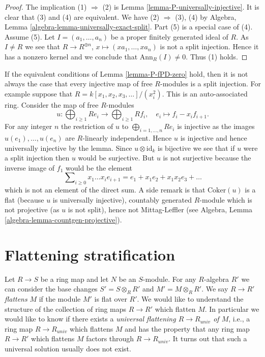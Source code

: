 \begin{proof}
The implication (1) $\Rightarrow$ (2) is
Lemma \ref{lemma-P-universally-injective}.
It is clear that (3) and (4) are equivalent.
We have (2) $\Rightarrow$ (3), (4) by
Algebra, Lemma \ref{algebra-lemma-universally-exact-split}.
Part (5) is a special case of (4).
Assume (5). Let $I = (a_1, \ldots, a_n)$ be a proper finitely generated
ideal of $R$. As $I \not = R$ we see that
$R \to R^{\oplus n}$, $x \mapsto (xa_1, \ldots, xa_n)$
is not a split injection. Hence it has a nonzero kernel and we conclude
that $\text{Ann}_R(I) \not = 0$. Thus (1) holds.
\end{proof}

\begin{example}
\label{example-auto-ass-weird-flat}
If the equivalent conditions of
Lemma \ref{lemma-P-fPD-zero}
hold, then it is not always the case that every injective map of
free $R$-modules is a split injection. For example suppose that
$R = k[x_1, x_2, x_3, \ldots]/(x_i^2)$. This is an auto-associated ring.
Consider the map of free $R$-modules
$$
u :
\bigoplus\nolimits_{i \geq 1} Re_i
\longrightarrow
\bigoplus\nolimits_{i \geq 1} Rf_i, \quad
e_i \longmapsto f_i - x_if_{i + 1}.
$$
For any integer $n$ the restriction of $u$ to
$\bigoplus_{i = 1, \ldots, n} Re_i$ is injective as the images
$u(e_1), \ldots, u(e_n)$ are $R$-linearly independent. Hence
$u$ is injective and hence universally injective by the lemma.
Since $u \otimes \text{id}_k$ is bijective we see that if
$u$ were a split injection then $u$ would be surjective. But $u$ is not
surjective because the inverse image of $f_1$ would be the element
$$
\sum\nolimits_{i \geq 0} x_1 \ldots x_ie_{i + 1} =
e_1 + x_1e_2 + x_1x_2e_3 + \ldots
$$
which is not an element of the direct sum. A side remark is that
$\text{Coker}(u)$ is a flat (because $u$ is universally injective),
countably generated $R$-module which is not projective (as $u$ is not
split), hence not Mittag-Leffler (see
Algebra, Lemma \ref{algebra-lemma-countgen-projective}).
\end{example}









\section{Flattening stratification}
\label{section-flattening}

\noindent
Let $R \to S$ be a ring map and let $N$ be an $S$-module.
For any $R$-algebra $R'$ we can consider the base changes
$S' = S \otimes_R R'$ and $M' = M \otimes_R R'$.
We say $R \to R'$ {\it flattens} $M$ if the module $M'$ is flat over $R'$.
We would like to understand the structure of the collection of ring maps
$R \to R'$ which flatten $M$. In particular we would like to know
if there exists a {\it universal flattening $R \to R_{univ}$ of $M$},
i.e., a ring map $R \to R_{univ}$ which flattens $M$ and has the property
that any ring map $R \to R'$ which flattens $M$ factors through
$R \to R_{univ}$. It turns out that such a universal solution usually
does not exist.

